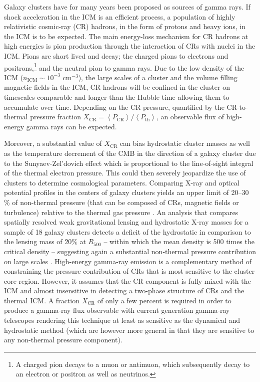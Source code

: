 \documentclass[12pt,manuscript]{aastex}
\newcommand{\expval}[1]{\left\langle #1 \right\rangle}
\newcommand{\CR}{\mathrm{CR}}
\begin{document}
Galaxy clusters have for many years been proposed as sources of gamma rays. If shock acceleration in the ICM is an efficient process, a population of highly relativistic cosmic-ray (CR) hadrons, in the form of protons and heavy ions, in the ICM is to be expected. The main energy-loss mechanism for CR hadrons at high energies is pion production through the interaction of CRs with nuclei in the ICM. Pions are short lived and decay; the charged pions to electrons and positrons,\footnote{A charged pion decays to a muon or antimuon, which subsequently decay to an electron or positron as well as neutrinos.} and the neutral pion to gamma rays. Due to the low density of the ICM ($n_{\mathrm{ICM}}\sim 10^{-3}$ cm$^{-3}$), the large scales of a cluster and the volume filling magnetic fields in the ICM, CR hadrons will be confined in the cluster on timescales comparable and longer than the Hubble time \citep[][]{article:Volk_etal:1996, article:Berezinsky_etal:1997} allowing them to accumulate over time.  Depending on the CR pressure, quantified by the CR-to-thermal pressure fraction $X_\CR=\expval{P_{\CR}}/\expval{P_{\mathrm{th}}}$, an observable flux of high-energy gamma rays can be expected.

Moreover, a substantial value of $X_\CR$ can bias hydrostatic cluster masses as well as the temperature decrement of the CMB in the direction of a galaxy cluster due to the Sunyaev-Zel'dovich effect which is proportional to the line-of-sight integral of the thermal electron pressure. This could then severely jeopardize the use of clusters to determine cosmological parameters. Comparing X-ray and optical potential profiles in the centers of galaxy clusters yields an upper limit of 20--30 \% of non-thermal pressure (that can be composed of CRs, magnetic fields or turbulence) relative to the thermal gas pressure \citep{2008MNRAS.388.1062C, 2010MNRAS.404.1165C}. An analysis that compares spatially resolved weak gravitational lensing and hydrostatic X-ray masses for a sample of 18 galaxy clusters detects a deficit of the hydrostatic in comparison to the lensing mass of $20 \%$ at $R_{500}$ -- within which the
mean density is 500 times the critical density -- suggesting again a substantial non-thermal pressure contribution on large scales \citep{2008MNRAS.384.1567M}. High-energy gamma-ray emission is a complementary method of constraining the pressure contribution of CRs that is most sensitive
to the cluster core region. However, it assumes that the CR component is fully mixed with the ICM and almost insensitive in detecting a two-phase structure of CRs and the thermal ICM.  A fraction $X_\CR$ of only a few percent is required in order to produce a gamma-ray flux observable with current generation
gamma-ray telescopes rendering this technique at least as sensitive as the dynamical and hydrostatic method (which are however more general in that they are sensitive to any non-thermal pressure component).
\end{document}
